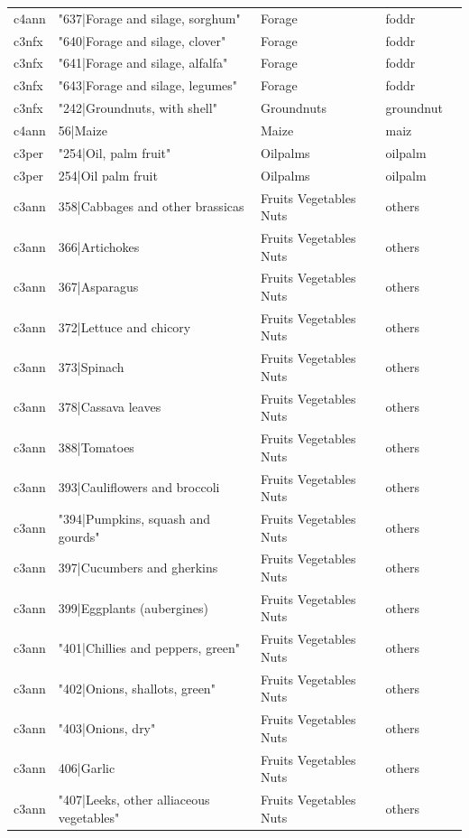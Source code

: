 \documentclass[gc, manuscript]{copernicus}
\begin{document}
\begin{table}[htbp]
\begin{tabular}{lllll}
      c4ann & "637|Forage and silage, sorghum" & Forage & foddr \\ 
      c3nfx & "640|Forage and silage, clover" & Forage & foddr \\ 
      c3nfx & "641|Forage and silage, alfalfa" & Forage & foddr \\ 
      c3nfx & "643|Forage and silage, legumes" & Forage & foddr \\ 
      c3nfx & "242|Groundnuts, with shell" & Groundnuts & groundnut \\ 
      c4ann & 56|Maize & Maize & maiz \\ 
      c3per & "254|Oil, palm fruit" & Oilpalms & oilpalm \\ 
      c3per & 254|Oil palm fruit & Oilpalms & oilpalm \\ 
      c3ann & 358|Cabbages and other brassicas & Fruits Vegetables Nuts & others \\ 
      c3ann & 366|Artichokes & Fruits Vegetables Nuts & others \\ 
      c3ann & 367|Asparagus & Fruits Vegetables Nuts & others \\ 
      c3ann & 372|Lettuce and chicory & Fruits Vegetables Nuts & others \\ 
      c3ann & 373|Spinach & Fruits Vegetables Nuts & others \\ 
      c3ann & 378|Cassava leaves & Fruits Vegetables Nuts & others \\ 
      c3ann & 388|Tomatoes & Fruits Vegetables Nuts & others \\ 
      c3ann & 393|Cauliflowers and broccoli & Fruits Vegetables Nuts & others \\ 
      c3ann & "394|Pumpkins, squash and gourds" & Fruits Vegetables Nuts & others \\ 
      c3ann & 397|Cucumbers and gherkins & Fruits Vegetables Nuts & others \\ 
      c3ann & 399|Eggplants (aubergines) & Fruits Vegetables Nuts & others \\ 
      c3ann & "401|Chillies and peppers, green" & Fruits Vegetables Nuts & others \\ 
      c3ann & "402|Onions, shallots, green" & Fruits Vegetables Nuts & others \\ 
      c3ann & "403|Onions, dry" & Fruits Vegetables Nuts & others \\ 
      c3ann & 406|Garlic & Fruits Vegetables Nuts & others \\ 
      c3ann & "407|Leeks, other alliaceous vegetables" & Fruits Vegetables Nuts & others \\ 

\end{tabular}
\end{table}
\end{document}

